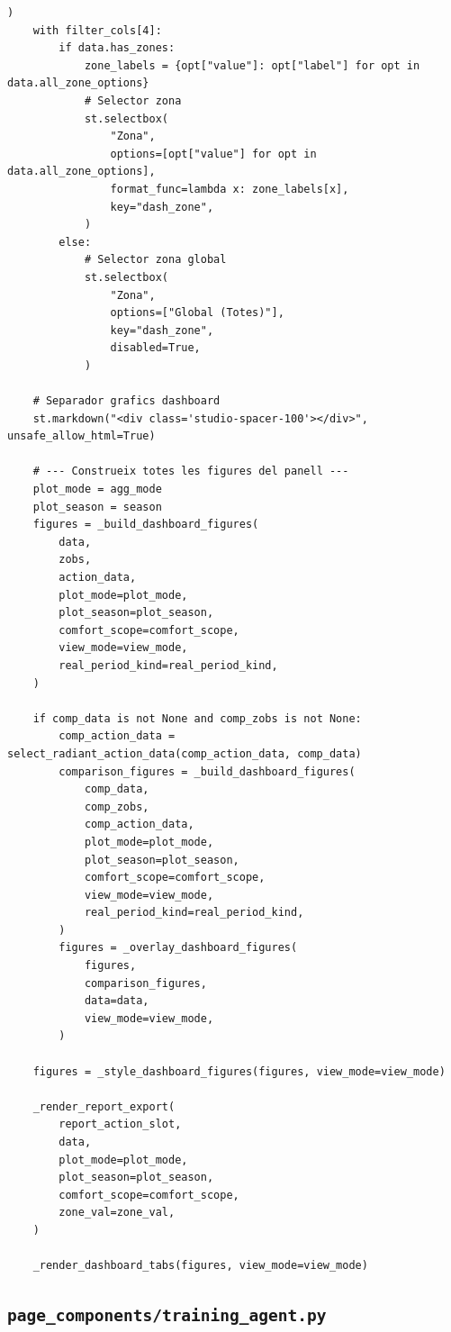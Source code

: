 \documentclass[10pt,a4paper]{article}
\begin{document}
\begin{lstlisting}[style=studioPython,caption={page\_components/resultats\_dashboard.py},label={lst:page-components-resultats-dashboard-py}]
        )
    with filter_cols[4]:
        if data.has_zones:
            zone_labels = {opt["value"]: opt["label"] for opt in data.all_zone_options}
            # Selector zona
            st.selectbox(
                "Zona",
                options=[opt["value"] for opt in data.all_zone_options],
                format_func=lambda x: zone_labels[x],
                key="dash_zone",
            )
        else:
            # Selector zona global
            st.selectbox(
                "Zona",
                options=["Global (Totes)"],
                key="dash_zone",
                disabled=True,
            )

    # Separador grafics dashboard
    st.markdown("<div class='studio-spacer-100'></div>", unsafe_allow_html=True)

    # --- Construeix totes les figures del panell ---
    plot_mode = agg_mode
    plot_season = season
    figures = _build_dashboard_figures(
        data,
        zobs,
        action_data,
        plot_mode=plot_mode,
        plot_season=plot_season,
        comfort_scope=comfort_scope,
        view_mode=view_mode,
        real_period_kind=real_period_kind,
    )

    if comp_data is not None and comp_zobs is not None:
        comp_action_data = select_radiant_action_data(comp_action_data, comp_data)
        comparison_figures = _build_dashboard_figures(
            comp_data,
            comp_zobs,
            comp_action_data,
            plot_mode=plot_mode,
            plot_season=plot_season,
            comfort_scope=comfort_scope,
            view_mode=view_mode,
            real_period_kind=real_period_kind,
        )
        figures = _overlay_dashboard_figures(
            figures,
            comparison_figures,
            data=data,
            view_mode=view_mode,
        )

    figures = _style_dashboard_figures(figures, view_mode=view_mode)

    _render_report_export(
        report_action_slot,
        data,
        plot_mode=plot_mode,
        plot_season=plot_season,
        comfort_scope=comfort_scope,
        zone_val=zone_val,
    )

    _render_dashboard_tabs(figures, view_mode=view_mode)
\end{lstlisting}


\subsection{\texorpdfstring{\texttt{page\_components/training\_agent.py}}{page\_components/training\_agent.py}}
\end{document}
